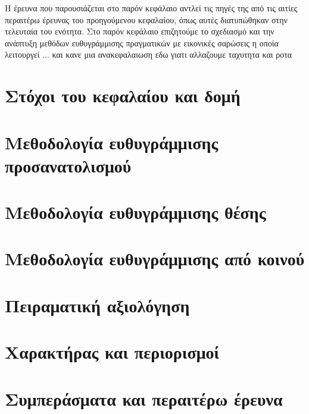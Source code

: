 Η έρευνα που παρουσιάζεται στο παρόν κεφάλαιο αντλεί τις πηγές της από τις
αιτίες περαιτέρω έρευνας του προηγούμενου κεφαλαίου, όπως αυτές διατυπώθηκαν
στην τελευταία του ενότητα. Στο παρόν κεφάλαιο επιζητούμε το σχεδιασμό και
την ανάπτυξη μεθόδων ευθυγράμμισης πραγματικών με εικονικές σαρώσεις η οποία
λειτουργεί ... και κανε μια ανακεφαλαιωση εδω γιατι αλλαζουμε ταχυτητα και ροτα



\section{Στόχοι του κεφαλαίου και δομή}
  \label{section:02_04_01}
  

\section{Μεθοδολογία ευθυγράμμισης προσανατολισμού}
  \label{section:02_04_02}
  

\section{Μεθοδολογία ευθυγράμμισης θέσης}
  \label{section:02_04_03}
  

\section{Μεθοδολογία ευθυγράμμισης από κοινού}
  \label{section:02_04_04}
  

\section{Πειραματική αξιολόγηση}
  \label{section:02_04_05}
  

\section{Χαρακτήρας και περιορισμοί}
  \label{section:02_04_06}
  

\section{Συμπεράσματα και περαιτέρω έρευνα}
  \label{section:02_04_07}
  
